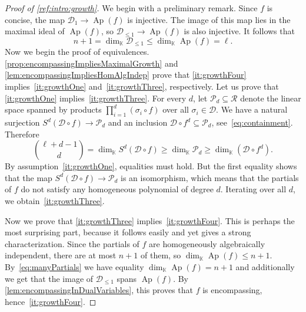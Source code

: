 \documentclass[a4paper,11pt,reqno]{amsart}
\newcommand{\calD}{\mathcal{D}}
\newcommand{\calP}{\mathcal{P}}
\newcommand{\calR}{\mathcal{R}}
\newcommand{\bbK}{\mathbb{K}}
\DeclareMathOperator{\Ap}{Ap}
\numberwithin{equation}{section}
\theoremstyle{definition}
\theoremstyle{plain}
\theoremstyle{remark}
\begin{document}
\begin{proof}[Proof of \autoref{ref:intro:growth}]
    {We begin with a preliminary remark.}
    Since $f$ is
    concise, the map $\calD_{1}\to \Ap(f)$ is injective. The image of this map
    lies in the maximal ideal of $\Ap(f)$, {so $\calD_{\leq 1}\to
    \Ap(f)$ is also injective.} It follows that
    \begin{equation}\label{eq:manyPartials}
        n+1 = \dim_{\bbK} \calD_{\leq 1}\leq \dim_{\bbK} \Ap(f) = \ell.
    \end{equation}
   Now we begin the proof of {equivalences.}
    \autoref{prop:encompassingImpliesMaximalGrowth}
    and
    \autoref{lem:encompassingImpliesHomAlgIndep}
    prove that
    \ref{it:growthFour} implies~\ref{it:growthOne} and~\ref{it:growthThree},
    respectively.
    Let us prove that \ref{it:growthOne} implies~\ref{it:growthThree}. For
    every $d$, let $\calP_d\subseteq \calR$ denote the linear space spanned by products
    $\prod_{i=1}^d(\sigma_i\circ f)$ over all $\sigma_{i}\in \calD$.
    We have a natural surjection $S^{d} (\calD\circ f)\to \calP_d$ and an
    inclusion $\calD\circ f^d\subseteq \calP_d$, see~\eqref{eq:containment}.
    Therefore
    \[
        \binom{\ell+d-1}{d} = \dim_{\bbK} S^d (\calD\circ f) \geq \dim_{\bbK} \calP_d
        \geq \dim_{\bbK} (\calD\circ f^d).
    \]
    By assumption~\ref{it:growthOne}, {equalities} must hold. But the first
    equality shows that the map $S^d(\calD \circ f) \to \calP_d$ is an
    isomorphism, which means that the partials of $f$ {do not satisfy any} homogeneous
    polynomial of degree $d$. Iterating over all $d$, we
    obtain~\ref{it:growthThree}.

    Now we prove that \ref{it:growthThree} implies~\ref{it:growthFour}. This
    is perhaps the most surprising part, because it follows easily and yet gives a
    strong characterization. Since the partials of $f$ are homogeneously
    algebraically independent, there are at most $n+1$ of them, so $\dim_{\bbK}
    \Ap(f)\leq n+1$. By~\eqref{eq:manyPartials} we have equality $\dim_{\bbK} \Ap(f)
= n+1$ and
    additionally {we get} that
    the image of $\calD_{\leq 1}$ spans $\Ap(f)$.
    By
    \autoref{lem:encompassingInDualVariables}, this proves that $f$ is
    encompassing, hence~\ref{it:growthFour}.


\end{proof}
\end{document}

